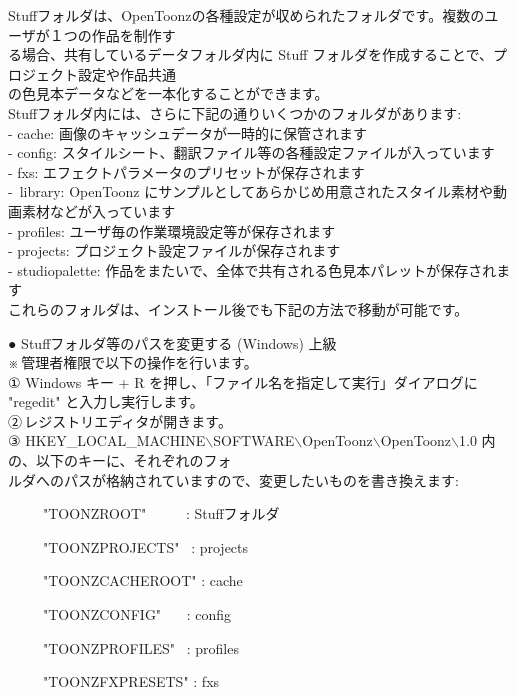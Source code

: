 \documentclass[a4paper,10pt]{article}
\begin{document}
\normalsize
\noindent Stuffフォルダは、OpenToonzの各種設定が収められたフォルダです。複数のユーザが１つの作品を制作す\\
る場合、共有しているデータフォルダ内に Stuff フォルダを作成することで、プロジェクト設定や作品共通\\
の色見本データなどを一本化することができます。\\
Stuffフォルダ内には、さらに下記の通りいくつかのフォルダがあります:\\
- cache: 画像のキャッシュデータが一時的に保管されます\\
- config: スタイルシート、翻訳ファイル等の各種設定ファイルが入っています\\
- fxs: エフェクトパラメータのプリセットが保存されます\\
- \,library: OpenToonz にサンプルとしてあらかじめ用意されたスタイル素材や動画素材などが入っています\\
- profiles: ユーザ毎の作業環境設定等が保存されます\\
- projects: プロジェクト設定ファイルが保存されます\\
- studiopalette: 作品をまたいで、全体で共有される色見本パレットが保存されます\\
これらのフォルダは、インストール後でも下記の方法で移動が可能です。\\[0.4em]
\par
\large
\noindent ● Stuffフォルダ等のパスを変更する (Windows) \normalsize \colorbox{fontpink}{\color{black}上級}\\
※\,管理者権限で以下の操作を行います。\\
① Windows キー + R を押し、「ファイル名を指定して実行」ダイアログに "regedit" と入力し実行します。\\
②\,レジストリエディタが開きます。\\
③ HKEY\_LOCAL\_MACHINE$\backslash$SOFTWARE$\backslash$OpenToonz$\backslash$OpenToonz$\backslash$1.0 内の、以下のキーに、それぞれのフォ\\
ルダへのパスが格納されていますので、変更したいものを書き換えます:\par
\ \ \ \ \ "TOONZROOT" \ \ \ \ \ : Stuffフォルダ\par
\ \ \ \ \ "TOONZPROJECTS" \ : projects\par
\ \ \ \ \ "TOONZCACHEROOT" : cache\par
\ \ \ \ \ "TOONZCONFIG" \ \ \ : config\par
\ \ \ \ \ "TOONZPROFILES" \ : profiles\par
\ \ \ \ \ "TOONZFXPRESETS"  : fxs\par
\end{document}
